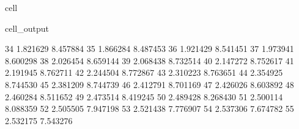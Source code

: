 \documentclass[letterpaper,10pt,english]{jupyterBook}
\begin{document}
\begin{sphinxuseclass}{cell}
\begin{sphinxVerbatimOutput}
\begin{sphinxuseclass}{cell_output}
\begin{sphinxVerbatim}[commandchars=\\\{\}]
					34                1.821629                    \PYGZhy{}8.457884   
					35                1.866284                    \PYGZhy{}8.487453   
					36                1.921429                    \PYGZhy{}8.541451   
					37                1.973941                    \PYGZhy{}8.600298   
					38                2.026454                    \PYGZhy{}8.659144   
					39                2.068438                    \PYGZhy{}8.732514   
					40                2.147272                    \PYGZhy{}8.752617   
					41                2.191945                    \PYGZhy{}8.762711   
					42                2.244504                    \PYGZhy{}8.772867   
					43                2.310223                    \PYGZhy{}8.763651   
					44                2.354925                    \PYGZhy{}8.744530   
					45                2.381209                    \PYGZhy{}8.744739   
					46                2.412791                    \PYGZhy{}8.701169   
					47                2.426026                    \PYGZhy{}8.603892   
					48                2.460284                    \PYGZhy{}8.511652   
					49                2.473514                    \PYGZhy{}8.419245   
					50                2.489428                    \PYGZhy{}8.268430   
					51                2.500114                    \PYGZhy{}8.088359   
					52                2.505505                    \PYGZhy{}7.947198   
					53                2.521438                    \PYGZhy{}7.776907   
					54                2.537306                    \PYGZhy{}7.674782   
					55                2.532175                    \PYGZhy{}7.543276   
					

\end{sphinxVerbatim}
\end{sphinxuseclass}
\end{sphinxVerbatimOutput}
\end{sphinxuseclass}
\end{document}
